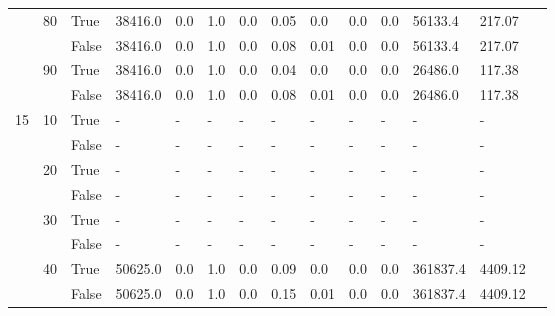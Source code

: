 \begin{landscape}
\begin{small}
\begin{longtable}[c]{@{}lll|ll|ll|ll|ll|lll@{}}
   & 80 & True  & 38416.0         & 0.0            & 1.0           & 0.0           & 0.05          & 0.0           & 0.0           & 0.0           & 56133.4       & 217.07      &  \\
   &    & False & 38416.0         & 0.0            & 1.0           & 0.0           & 0.08          & 0.01          & 0.0           & 0.0           & 56133.4       & 217.07      &  \\
   & 90 & True  & 38416.0         & 0.0            & 1.0           & 0.0           & 0.04          & 0.0           & 0.0           & 0.0           & 26486.0       & 117.38      &  \\
   &    & False & 38416.0         & 0.0            & 1.0           & 0.0           & 0.08          & 0.01          & 0.0           & 0.0           & 26486.0       & 117.38      &  \\
  \midrule
15 & 10 & True  & -               & -              & -             & -             & -             & -             & -             & -             & -             & -           &  \\
   &    & False & -               & -              & -             & -             & -             & -             & -             & -             & -             & -           &  \\
   & 20 & True  & -               & -              & -             & -             & -             & -             & -             & -             & -             & -           &  \\
   &    & False & -               & -              & -             & -             & -             & -             & -             & -             & -             & -           &  \\
   & 30 & True  & -               & -              & -             & -             & -             & -             & -             & -             & -             & -           &  \\
   &    & False & -               & -              & -             & -             & -             & -             & -             & -             & -             & -           &  \\
   & 40 & True  & 50625.0         & 0.0            & 1.0           & 0.0           & 0.09          & 0.0           & 0.0           & 0.0           & 361837.4      & 4409.12     &  \\
   &    & False & 50625.0         & 0.0            & 1.0           & 0.0           & 0.15          & 0.01          & 0.0           & 0.0           & 361837.4      & 4409.12     &  \\

\end{longtable}
\end{small}
\end{landscape}
